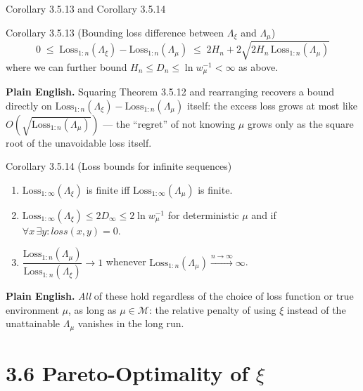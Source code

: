 \documentclass[aspectratio=169,10pt]{beamer}
\newcommand{\Mcal}{\mathcal{M}}
\newcommand{\Loss}{\mathrm{Loss}}
\newcommand{\loss}{\mathit{loss}}
\begin{document}
\begin{frame}{Corollary 3.5.13 and Corollary 3.5.14}
  \begin{block}{Corollary 3.5.13 (Bounding loss difference between $\Lambda_\xi$ and $\Lambda_\mu$)}
    \[
      0 \; \le \; \Loss_{1:n}(\Lambda_\xi)-\Loss_{1:n}(\Lambda_\mu)
      \; \le \; 2H_n + 2\sqrt{2H_n\,\Loss_{1:n}(\Lambda_\mu)}
    \]
    where we can further bound $H_n \le D_n \le \ln w_\mu^{-1} < \infty$ as above.
  \end{block}
  \textbf{Plain English.} Squaring Theorem 3.5.12 and rearranging recovers a
  bound directly on $\Loss_{1:n}(\Lambda_\xi)-\Loss_{1:n}(\Lambda_\mu)$
  itself: the excess loss grows at most like $O(\sqrt{\Loss_{1:n}(\Lambda_\mu)})$
  --- the ``regret'' of not knowing $\mu$ grows only as the square root of
  the unavoidable loss itself.

  \begin{block}{Corollary 3.5.14 (Loss bounds for infinite sequences)}
    \begin{enumerate}
      \item[(i)] $\Loss_{1:\infty}(\Lambda_\xi)$ is finite iff $\Loss_{1:\infty}(\Lambda_\mu)$ is finite.
      \item[(ii)] $\Loss_{1:\infty}(\Lambda_\xi)\le 2D_\infty\le 2\ln w_\mu^{-1}$ for deterministic $\mu$ and if $\forall x\,\exists y: \loss(x,y)=0$.
      \item[(iii)] $\dfrac{\Loss_{1:n}(\Lambda_\mu)}{\Loss_{1:n}(\Lambda_\xi)}\to 1$ whenever $\Loss_{1:n}(\Lambda_\mu)\xrightarrow{n\to\infty}\infty$.
    \end{enumerate}
  \end{block}
  \textbf{Plain English.} \emph{All} of these hold regardless of the choice
  of loss function or true environment $\mu$, as long as $\mu\in\Mcal$: the
  relative penalty of using $\xi$ instead of the unattainable $\Lambda_\mu$
  vanishes in the long run.
\end{frame}

\section{3.6 Pareto-Optimality of $\xi$}
\end{document}

